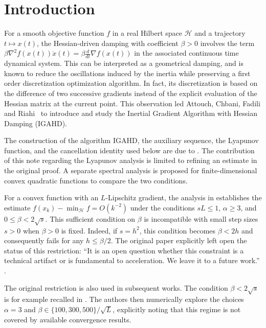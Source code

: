 \documentclass[11pt]{article}
\theoremstyle{plain}
\theoremstyle{definition}
\newcommand{\Hc}{\mathcal H}
\newcommand{\IGAHD}{\textup{IGAHD}\xspace}
\begin{document}
\section{Introduction}\label{sec:introduction}
For a smooth objective function $f$ in a real Hilbert space $\Hc$ and a trajectory $t\mapsto x(t)$, the Hessian-driven damping with coefficient $\beta>0$ involves the term $\beta\nabla^2 f(x(t))\dot{x}(t)=\beta \frac{d}{dt}\nabla f(x(t))$ in the associated continuous time dynamical system. This can be interpreted as a  geometrical damping, and is known to reduce the oscillations induced by the inertia while preserving a first order discretization optimization algorithm. In fact, its discretization is based on the difference of two successive gradients instead of the explicit evaluation of the Hessian matrix at the current point. This observation led Attouch, Chbani, Fadili  and Riahi~\cite{AFCR2022} to introduce and study the Inertial Gradient Algorithm with Hessian Damping (IGAHD).

The construction of the algorithm \IGAHD, the auxiliary sequence, the Lyapunov function, and the cancellation identity used below are due to \cite{AFCR2022}. 
The contribution of this note regarding the Lyapunov analysis is limited to refining an estimate in the original proof. A separate spectral analysis is proposed for finite-dimensional convex quadratic functions to compare the two conditions.

For a convex function with an $L$-Lipschitz gradient, the analysis in \cite[Theorem~6]{AFCR2022} establishes the estimate $f(x_k)-\min_{\mathcal{H}}f=O(k^{-2})$ under the conditions $sL\leq 1$, $\alpha\geq 3$, and $0\leq\beta<2\sqrt{s}$. This sufficient condition on $\beta$ is incompatible with small step sizes $s>0$ when $\beta>0$ is fixed. Indeed, if $s=h^2$, this condition becomes $\beta<2h$ and consequently fails for any $h\leq\beta/2$. The original paper \cite{AFCR2022} explicitly left open the status of this restriction: ``It is an open question whether this constraint is a technical artifact or is fundamental to acceleration. We leave it to a future work.'' \cite[Remark~3]{AFCR2022}.

The original restriction is also used in subsequent works. The condition $\beta<2\sqrt{s}$ is for example recalled in \cite[Section~4]{ADHLR2023}. The authors then numerically explore the choices $\alpha=3$ and $\beta\in\{100,300,500\}/\sqrt{L}$, explicitly noting that this regime is not covered by available convergence results.
\end{document}
